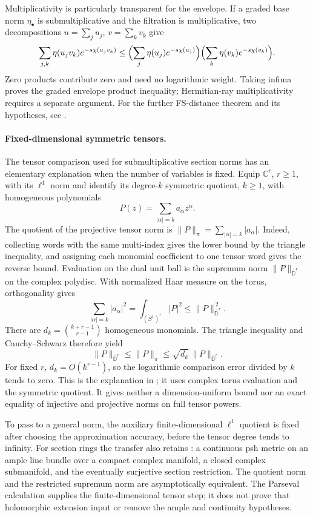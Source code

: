 Multiplicativity is particularly transparent for the envelope.
If a graded base norm \(\eta_\bullet\) is submultiplicative
and the filtration is multiplicative, two decompositions
\(u=\sum_j u_j\), \(v=\sum_k v_k\) give
\[
 \sum_{j,k}\eta(u_jv_k)e^{-s\chi(u_jv_k)}
 \le
 \Bigl(\sum_j\eta(u_j)e^{-s\chi(u_j)}\Bigr)
 \Bigl(\sum_k\eta(v_k)e^{-s\chi(v_k)}\Bigr).
\]
Zero products contribute zero and need no logarithmic weight.
Taking infima proves the graded envelope product inequality;
Hermitian-ray multiplicativity requires a separate argument.
For the further FS-distance theorem and its hypotheses, see
.

\paragraph{Fixed-dimensional symmetric tensors.}
The tensor comparison used for submultiplicative section norms has
an elementary explanation when the number of variables is fixed.
Equip \(\mathbb C^r\), \(r\ge1\), with its \(\ell^1\) norm and
identify its degree-\(k\) symmetric quotient, \(k\ge1\), with
homogeneous polynomials
\[
               P(z)=\sum_{|\alpha|=k}a_\alpha z^\alpha.
\]
The quotient of the projective tensor norm is
\(\|P\|_\pi=\sum_{|\alpha|=k}|a_\alpha|\).
Indeed, collecting words with the same multi-index gives the
lower bound by the triangle inequality, and assigning each
monomial coefficient to one tensor word gives the reverse bound.
Evaluation on the dual unit ball is the supremum norm
\(\|P\|_{\overline{\mathbb D}^r}\) on the complex polydisc.
With normalized Haar measure on the torus, orthogonality gives
\[
 \sum_{|\alpha|=k}|a_\alpha|^2
       =\int_{(S^1)^r}|P|^2
       \le\|P\|_{\overline{\mathbb D}^r}^{\,2}.
\]
There are \(d_k=\binom{k+r-1}{r-1}\) homogeneous monomials.
The triangle inequality and Cauchy--Schwarz therefore yield
\[
 \|P\|_{\overline{\mathbb D}^r}
       \le\|P\|_\pi
       \le\sqrt{d_k}\,\|P\|_{\overline{\mathbb D}^r}.
\]
For fixed \(r\), \(d_k=O(k^{r-1})\), so the logarithmic
comparison error divided by \(k\) tends to zero.
This is the explanation in
\cite[Remark~4.3]{Finski25SubmultiplicativePublished}; it uses
complex torus evaluation and the symmetric quotient. It gives
neither a dimension-uniform bound nor an exact equality of
injective and projective norms on full tensor powers.

To pass to a general norm, the auxiliary finite-dimensional
\(\ell^1\) quotient is fixed after choosing the approximation
accuracy, before the tensor degree tends to infinity.
For section rings the transfer also retains
\cite[Theorem~3.10]{Finski25SubmultiplicativePublished}:
a continuous psh metric on an ample line bundle over a compact
complex manifold, a closed complex submanifold, and the
eventually surjective section restriction. The quotient norm
and the restricted supremum norm are asymptotically equivalent.
The Parseval calculation supplies the finite-dimensional tensor
step; it does not prove that holomorphic extension input or
remove the ample and continuity hypotheses.

